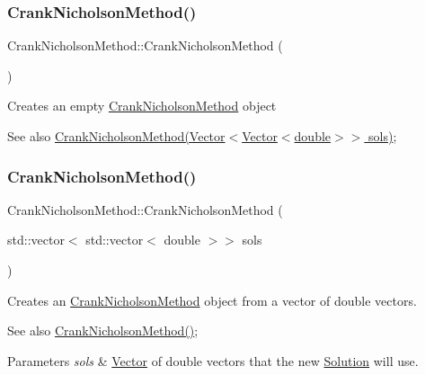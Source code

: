 \subsubsection{\texorpdfstring{Crank\+Nicholson\+Method()}{CrankNicholsonMethod()}\hspace{0.1cm}{\footnotesize\ttfamily [1/2]}}
{\footnotesize\ttfamily Crank\+Nicholson\+Method\+::\+Crank\+Nicholson\+Method (\begin{DoxyParamCaption}{ }\end{DoxyParamCaption})}

Creates an empty \hyperlink{class_crank_nicholson_method}{Crank\+Nicholson\+Method} object \begin{DoxySeeAlso}{See also}
\hyperlink{class_crank_nicholson_method}{Crank\+Nicholson\+Method(\+Vector$<$\+Vector$<$double$>$$>$ sols)}; 
\end{DoxySeeAlso}
\mbox{\label{class_crank_nicholson_method_a9738c40cac3d4f37775d6211544b178f}} 
\subsubsection{\texorpdfstring{Crank\+Nicholson\+Method()}{CrankNicholsonMethod()}\hspace{0.1cm}{\footnotesize\ttfamily [2/2]}}
{\footnotesize\ttfamily Crank\+Nicholson\+Method\+::\+Crank\+Nicholson\+Method (\begin{DoxyParamCaption}\item[{std\+::vector$<$ std\+::vector$<$ double $>$$>$}]{sols }\end{DoxyParamCaption})}

Creates an \hyperlink{class_crank_nicholson_method}{Crank\+Nicholson\+Method} object from a vector of double vectors. \begin{DoxySeeAlso}{See also}
\hyperlink{class_crank_nicholson_method_ae5052444cd3f042a554bb74d9ac556e0}{Crank\+Nicholson\+Method()}; 
\end{DoxySeeAlso}

\begin{DoxyParams}{Parameters}
{\em sols} & \hyperlink{class_vector}{Vector} of double vectors that the new \hyperlink{class_solution}{Solution} will use. \\
\hline
\end{DoxyParams}


